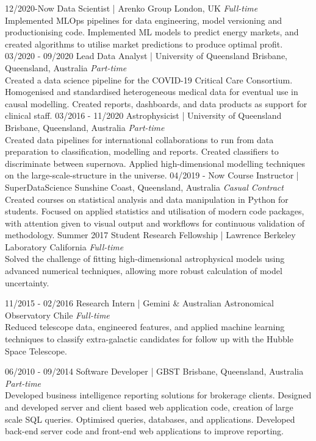 \documentclass[11pt]{friggeri-cv}
\begin{document}
\begin{entrylist}
\entry
{12/2020-Now}
{Data Scientist | Arenko Group}
{London, UK}
{\emph{Full-time} \\
Implemented MLOps pipelines for data engineering, model versioning and productionising code. Implemented ML models to predict energy markets, and created algorithms to utilise market predictions to produce optimal profit.}
\entry
{03/2020 - 09/2020}
{Lead Data Analyst | University of Queensland}
{Brisbane, Queensland, Australia}
{\emph{Part-time} \\
Created a data science pipeline for the COVID-19 Critical Care Consortium. Homogenised and standardised heterogeneous medical data for eventual use in causal modelling. Created reports, dashboards, and data products as support for clinical staff.}
\entry
{03/2016 - 11/2020}
{Astrophysicist | University of Queensland}
{Brisbane, Queensland, Australia}
{\emph{Part-time} \\
Created data pipelines for international collaborations to run from data preparation to classification, modelling and reports. Created classifiers to discriminate between supernova. Applied high-dimensional modelling techniques on the large-scale-structure in the universe.}
\entry
{04/2019 - Now}
{Course Instructor | SuperDataScience}
{Sunshine Coast, Queensland, Australia}
{\emph{Casual Contract} \\
Created courses on statistical analysis and data manipulation in Python for students. Focused on applied statistics and utilisation of modern code packages, with attention given to visual output and workflows for continuous validation of methodology.}
\entry
{Summer 2017}
{Student Research Fellowship | Lawrence Berkeley Laboratory}
{ California}
{ \emph{Full-time} \\
Solved the challenge of fitting high-dimensional astrophysical models using advanced numerical techniques, allowing more robust calculation of model uncertainty.}
\end{entrylist}
\begin{entrylist}
\entry
{11/2015 - 02/2016}
{Research Intern | Gemini \& Australian Astronomical Observatory}
{Chile}
{\emph{Full-time} \\
Reduced telescope data, engineered features, and applied machine learning techniques to classify extra-galactic candidates for follow up with the Hubble Space Telescope.}
\end{entrylist}
\begin{entrylist}
\entry
{06/2010 - 09/2014}
{Software Developer | GBST}
{Brisbane, Queensland, Australia}
{\emph{Part-time} \\
Developed business intelligence reporting solutions for brokerage clients. Designed and developed server and client based web application code, creation of large scale SQL queries. Optimised queries, databases, and applications. Developed back-end server code and front-end web applications to improve reporting.}

\end{entrylist}
\end{document}
